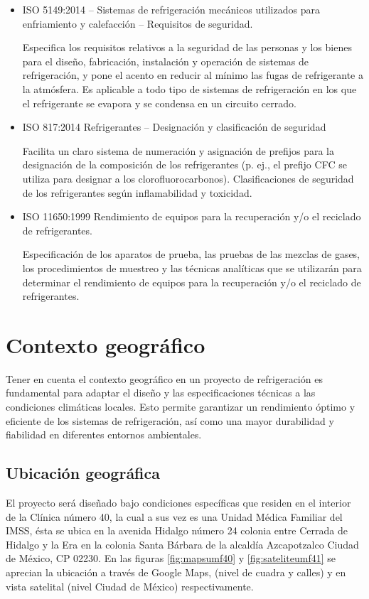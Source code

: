\begin{itemize}
	\item ISO 5149:2014 – Sistemas de refrigeración mecánicos utilizados para enfriamiento y calefacción – Requisitos de seguridad.
	
	Especifica los requisitos relativos a la seguridad de las personas y los bienes para el diseño, fabricación, instalación y operación de sistemas de refrigeración, y pone el acento en reducir al mínimo las fugas de refrigerante a la atmósfera. 
	Es aplicable a todo tipo de sistemas de refrigeración en los que el refrigerante se evapora y se condensa en un circuito cerrado. 
	\item	ISO 817:2014 Refrigerantes – Designación y clasificación de seguridad
	
	Facilita un claro sistema de numeración y asignación de prefijos para la designación de la composición de los refrigerantes (p. ej., el prefijo CFC se utiliza para designar a los clorofluorocarbonos).
	Clasificaciones de seguridad de los refrigerantes según inflamabilidad y toxicidad.
	
	\item	ISO 11650:1999 Rendimiento de equipos para la recuperación y/o el reciclado de refrigerantes.
	
	Especificación de los aparatos de prueba, las pruebas de las mezclas de gases, los procedimientos de muestreo y las técnicas analíticas que se utilizarán para determinar el rendimiento de equipos para la recuperación y/o el reciclado de refrigerantes.
	
\end{itemize}

\section{Contexto geográfico}\label{sec:contex_geografico}
	Tener en cuenta el contexto geográfico en un proyecto de refrigeración es fundamental para adaptar el diseño y las especificaciones técnicas a las condiciones climáticas locales. Esto permite garantizar un rendimiento óptimo y eficiente de los sistemas de refrigeración, así como una mayor durabilidad y fiabilidad en diferentes entornos ambientales.
	
	
\subsection{Ubicación geográfica}

El proyecto será diseñado bajo condiciones específicas que residen en el interior de la Clínica número 40, la cual a sus vez es una Unidad Médica Familiar del IMSS, ésta se ubica en la avenida Hidalgo número 24 colonia entre Cerrada de Hidalgo y la Era en la colonia Santa Bárbara de la alcaldía Azcapotzalco Ciudad de México, CP 02230. En las figuras \ref{fig:mapsumf40} y \ref{fig:sateliteumf41} se aprecian la ubicación a través de Google Maps, (nivel de cuadra y calles) y en vista satelital (nivel Ciudad de México) respectivamente. 


